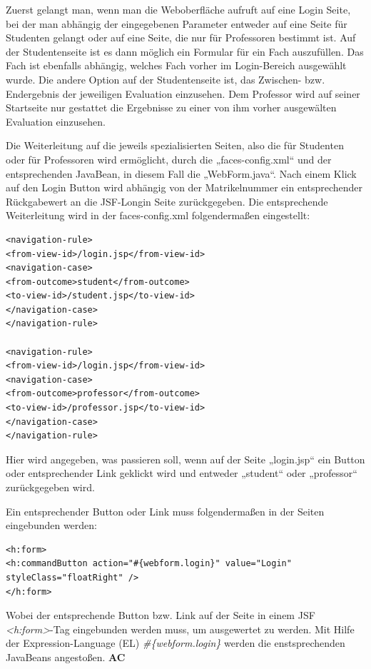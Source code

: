\documentclass[titlepage, 12pt,a4paper]{scrartcl}
\begin{document}
Zuerst gelangt man, wenn man die Weboberfläche aufruft auf eine Login Seite,
bei der man abhängig der eingegebenen Parameter entweder auf eine Seite für
Studenten gelangt oder auf eine Seite, die nur für Professoren bestimmt ist.
Auf der Studentenseite ist es dann möglich ein Formular für ein Fach
auszufüllen. Das Fach ist ebenfalls abhängig, welches Fach vorher im
Login-Bereich ausgewählt wurde. Die andere Option auf der Studentenseite ist,
das Zwischen- bzw. Endergebnis der jeweiligen Evaluation einzusehen. Dem
Professor wird auf seiner Startseite nur gestattet die Ergebnisse zu einer von
ihm vorher ausgewälten Evaluation einzusehen. 

Die Weiterleitung auf die jeweils spezialisierten Seiten, also die für
Studenten oder für Professoren wird ermöglicht, durch die „faces-config.xml“
und der entsprechenden JavaBean, in diesem Fall die „WebForm.java“. Nach einem
Klick auf den Login Button wird abhängig von der Matrikelnummer ein
entsprechender Rückgabewert an die JSF-Longin Seite zurückgegeben. Die
entsprechende Weiterleitung wird in der faces-config.xml folgendermaßen
eingestellt: 

\begin{lstlisting}
<navigation-rule>
<from-view-id>/login.jsp</from-view-id>
<navigation-case>
<from-outcome>student</from-outcome>
<to-view-id>/student.jsp</to-view-id>
</navigation-case>
</navigation-rule>

<navigation-rule>
<from-view-id>/login.jsp</from-view-id>
<navigation-case>
<from-outcome>professor</from-outcome>
<to-view-id>/professor.jsp</to-view-id>
</navigation-case>
</navigation-rule>
\end{lstlisting}

Hier wird angegeben, was passieren soll, wenn auf der Seite „login.jsp“ ein
Button oder entsprechender Link geklickt wird und entweder „student“ oder
„professor“ zurückgegeben wird.

Ein entsprechender Button oder Link muss folgendermaßen in der Seiten
eingebunden werden:

\begin{lstlisting}
<h:form>
<h:commandButton action="#{webform.login}" value="Login" styleClass="floatRight" />
</h:form>
\end{lstlisting}

Wobei der entsprechende Button bzw. Link auf der Seite in einem JSF
\emph{<h:form>}-Tag eingebunden werden muss, um ausgewertet zu werden. Mit Hilfe der Expression-Language (EL) \emph{\#\{webform.login\}} werden die
enstsprechenden JavaBeans angestoßen. 
{\bf{AC}}
\end{document}
